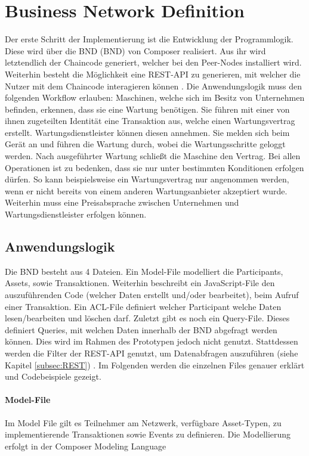 \section{Business Network Definition}
Der erste Schritt der Implementierung ist die Entwicklung der Programmlogik. Diese wird über die \acl{BND} (\acs{BND}) von Composer realisiert. Aus ihr wird letztendlich der Chaincode generiert, welcher bei den Peer-Nodes installiert wird. Weiterhin besteht die Möglichkeit eine REST-API zu generieren, mit welcher die Nutzer mit dem Chaincode interagieren können \cite{HyperledgerComposerTeamDeveloperTutorialHyperledger}. Die Anwendungslogik muss den folgenden Workflow erlauben: Maschinen, welche sich im Besitz von Unternehmen befinden, erkennen, dass sie eine Wartung benötigen. Sie führen mit einer von ihnen zugeteilten Identität eine Transaktion aus, welche einen Wartungsvertrag erstellt. Wartungsdienstleister können diesen annehmen. Sie melden sich beim Gerät an und führen die Wartung durch, wobei die Wartungsschritte geloggt werden. Nach ausgeführter Wartung schließt die Maschine den Vertrag. Bei allen Operationen ist zu bedenken, dass sie nur unter bestimmten Konditionen erfolgen dürfen. So kann beispielsweise ein Wartungsvertrag nur angenommen werden, wenn er nicht bereits von einem anderen Wartungsanbieter akzeptiert wurde. Weiterhin muss eine Preisabsprache zwischen Unternehmen und Wartungsdienstleister erfolgen können. 

\subsection{Anwendungslogik}
Die \acs{BND} besteht aus 4 Dateien. Ein Model-File modelliert die Participants, Assets, sowie Transaktionen. Weiterhin beschreibt ein JavaScript-File den auszuführenden Code (welcher Daten erstellt und/oder bearbeitet), beim Aufruf einer Transaktion. Ein ACL-File definiert welcher Participant welche Daten lesen/bearbeiten und löschen darf. Zuletzt gibt es noch ein Query-File. Dieses definiert Queries, mit welchen Daten innerhalb der \acs{BND} abgefragt werden können. Dies wird im Rahmen des Prototypen jedoch nicht genutzt. Stattdessen werden die Filter der REST-API genutzt, um Datenabfragen auszuführen (siehe Kapitel \ref{subsec:REST}) \cite{HyperledgerComposerTeamIntroductionHyperledgerComposer}. Im Folgenden werden die einzelnen Files genauer erklärt und Codebeispiele gezeigt.

\paragraph{Model-File}
Im Model File gilt es Teilnehmer am Netzwerk, verfügbare Asset-Typen, zu implementierende Transaktionen sowie Events zu definieren. Die Modellierung erfolgt in der Composer Modeling Language \cite{HyperledgerComposerTeamModelingLanguageHyperledger}

